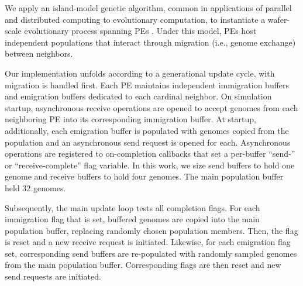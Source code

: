 

% 

We apply an island-model genetic algorithm, common in applications of parallel and distributed computing to evolutionary computation, to instantiate a wafer-scale evolutionary process spanning PEs \citep{bennett1999building}.
Under this model, PEs host independent populations that interact through migration (i.e., genome exchange) between neighbors.

Our implementation unfolds according to a generational update cycle, with migration is handled first.
Each PE maintains independent immigration buffers and emigration buffers dedicated to each cardinal neighbor.
On simulation startup, asynchronous receive operations are opened to accept genomes from each neighboring PE into its corresponding immigration buffer.
At startup, additionally, each emigration buffer is populated with genomes copied from the population and an asynchronous send request is opened for each. %
Asynchronous operations are registered to on-completion callbacks that set a per-buffer ``send-'' or ``receive-complete'' flag variable.
In this work, we size send buffers to hold one genome and receive buffers to hold four genomes.
The main population buffer held 32 genomes.

Subsequently, the main update loop tests all completion flags.
For each immigration flag that is set, buffered genomes are copied into the main population buffer, replacing randomly chosen population members.
Then, the flag is reset and a new receive request is initiated.
Likewise, for each emigration flag set, corresponding send buffers are re-populated with randomly sampled genomes from the main population buffer.
Corresponding flags are then reset and new send requests are initiated.

